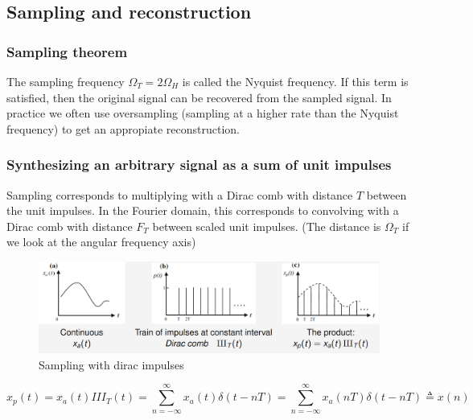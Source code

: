 \documentclass{article}
\begin{document}
\clearpage

\subsection{Sampling and reconstruction}
\subsubsection{Sampling theorem}
The sampling frequency $\Omega_T = 2\Omega_H$ is called the Nyquist frequency. If this term is satisfied, then the original signal can be recovered from the sampled signal. In practice we often use oversampling (sampling at a higher rate than the Nyquist frequency) to get an appropiate reconstruction.
\subsubsection{Synthesizing an arbitrary signal as a sum of unit impulses}

Sampling corresponds to multiplying with a Dirac comb with distance $T$ between the unit impulses.
In the Fourier domain, this corresponds to convolving with a Dirac comb with distance $F_T$ between
scaled unit impulses. (The distance is $\Omega_T$ if we look at the angular frequency axis)
\begin{figure}[h!]
    \centering
    \includegraphics[width=1\textwidth]{figures/Sampling and reconstruction/Sampling_dirac_impulses.png}
    \caption{Sampling with dirac impulses}
    \label{fig:sampling_dirac_impulses}
\end{figure}
\begin{equation}
    x_p (t) = x_a (t) III_T (t) = \sum_{n=-\infty}^{\infty} x_a (t) \delta (t - nT) = \sum_{n=-\infty}^{\infty} x_a (nT) \delta (t - nT) \triangleq x(n)
\end{equation}

\clearpage
\end{document}
